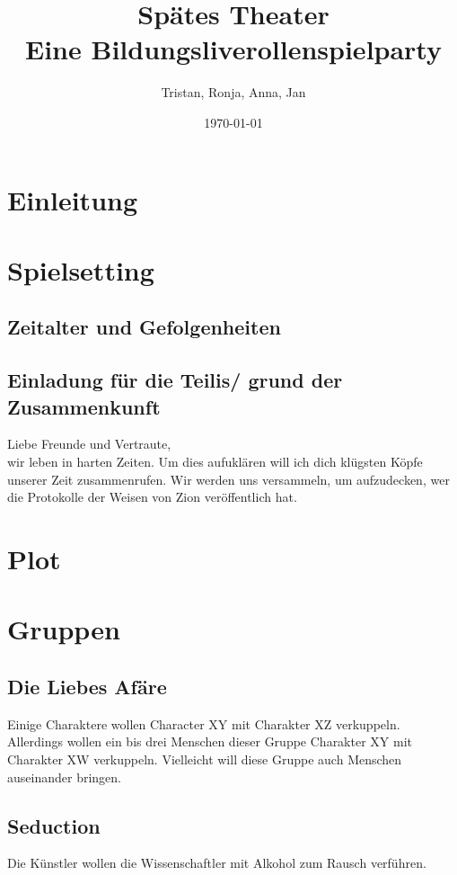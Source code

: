 \documentclass[12pt, a4paper, openany]{report}
\title{
    {Spätes Theater}\\
    {\large{Eine Bildungsliverollenspielparty}}\\
}
\author{Tristan, Ronja, Anna, Jan}
\date{\today}
\begin{document}
\maketitle
\frontmatter
\tableofcontents
\mainmatter

\chapter{Einleitung}

\chapter{Spielsetting}

\section{Zeitalter und Gefolgenheiten}

\section{Einladung für die Teilis/ grund der Zusammenkunft}
Liebe Freunde und Vertraute,\\
wir leben in harten Zeiten. 
Um dies aufuklären will ich dich klügsten Köpfe unserer Zeit zusammenrufen. 
Wir werden uns versammeln, um aufzudecken, wer die Protokolle der Weisen von Zion veröffentlich hat. 

\chapter{Plot}

\chapter{Gruppen}
\section{Die Liebes Afäre}
Einige Charaktere wollen Character XY mit Charakter XZ verkuppeln.
Allerdings wollen ein bis drei Menschen dieser Gruppe Charakter XY mit Charakter XW verkuppeln.
Vielleicht will diese Gruppe auch Menschen auseinander bringen.

\section{Seduction}
Die Künstler wollen die Wissenschaftler mit Alkohol zum Rausch verführen.
\end{document}
